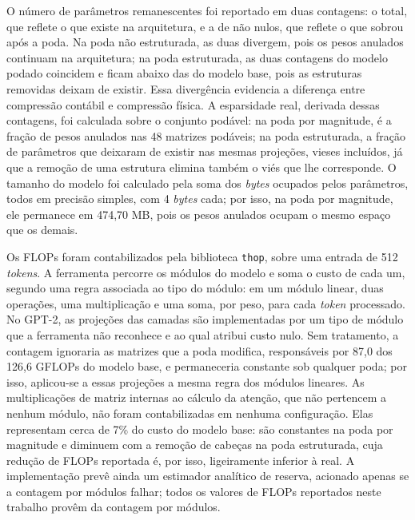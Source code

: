 O número de parâmetros remanescentes foi reportado em duas contagens: o total, que reflete o
que existe na arquitetura, e a de não nulos, que reflete o que sobrou após a poda. Na poda não
estruturada, as duas divergem, pois os pesos anulados continuam na arquitetura; na poda
estruturada, as duas contagens do modelo podado coincidem e ficam abaixo das do modelo base,
pois as estruturas removidas deixam de existir. Essa divergência evidencia a diferença entre
compressão contábil e compressão física. A esparsidade real, derivada dessas contagens, foi
calculada sobre o conjunto podável: na poda por magnitude, é a fração de pesos anulados nas
48 matrizes podáveis; na poda estruturada, a fração de parâmetros que deixaram de existir
nas mesmas projeções, vieses incluídos, já que a remoção de uma estrutura elimina também o
viés que lhe corresponde. O tamanho do modelo foi calculado pela soma dos \textit{bytes}
ocupados pelos parâmetros, todos em precisão simples, com 4 \textit{bytes} cada; por isso, na
poda por magnitude, ele permanece em 474,70 MB, pois os pesos anulados ocupam o mesmo espaço
que os demais.

Os FLOPs foram contabilizados pela biblioteca \texttt{thop}, sobre uma entrada de 512
\textit{tokens}. A ferramenta percorre os módulos do modelo e soma o custo de cada um,
segundo uma regra associada ao tipo do módulo: em um módulo linear, duas operações, uma
multiplicação e uma soma, por peso, para cada \textit{token} processado. No GPT-2, as
projeções das camadas são implementadas por um tipo de módulo que a ferramenta não reconhece
e ao qual atribui custo nulo. Sem tratamento, a contagem ignoraria as matrizes que a poda
modifica, responsáveis por 87,0 dos 126,6 GFLOPs do modelo base, e permaneceria constante sob
qualquer poda; por isso, aplicou-se a essas projeções a mesma regra dos módulos lineares. As
multiplicações de matriz internas ao cálculo da atenção, que não pertencem a nenhum módulo,
não foram contabilizadas em nenhuma configuração. Elas representam cerca de 7\% do custo do
modelo base: são constantes na poda por magnitude e diminuem com a remoção de cabeças na poda
estruturada, cuja redução de FLOPs reportada é, por isso, ligeiramente inferior à real. A
implementação prevê ainda um estimador analítico de reserva, acionado apenas se a contagem
por módulos falhar; todos os valores de FLOPs reportados neste trabalho provêm
da contagem por módulos.

